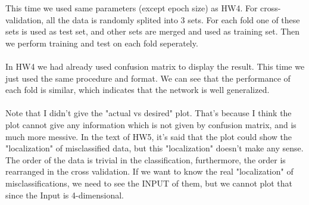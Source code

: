 \documentclass[epsfig]{article}
\begin{document}
This time we used same parameters (except epoch  size) as HW4. For cross-validation, all the data is randomly splited into 3 sets. For each fold one of these sets is used as test set, and other sets are merged and used as training set. Then we perform training and test on each fold seperately. \\
\\
In HW4 we had already used confusion matrix to display the result. This time we just used the same procedure and format. We can see that the performance of each fold is similar, which indicates that the network is well generalized.\\
\\
Note that I didn't give the "actual vs desired" plot. That's because I think the plot cannot give any information which is not given by confusion matrix, and is much more messive. In the text of HW5, it's said that the plot could show the "localization" of misclassified data, but this "localization" doesn't make any sense. The order of the data is trivial in the classification, furthermore, the order is rearranged in the cross validation. If we want to know the real "localization" of misclassifications, we need to see the INPUT of them, but we cannot plot that since the Input is 4-dimensional.\\
\end{document}
